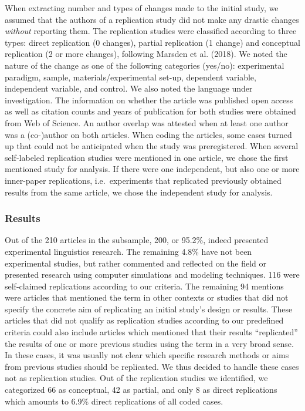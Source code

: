 \documentclass[]{elsarticle} %
\begin{document}
When extracting number and types of changes made to the initial study,
we assumed that the authors of a replication study did not make any
drastic changes \emph{without} reporting them. The replication studies
were classified according to three types: direct replication (0
changes), partial replication (1 change) and conceptual replication (2
or more changes), following Marsden et al. (2018). We noted the nature
of the change as one of the following categories (yes/no): experimental
paradigm, sample, materials/experimental set-up, dependent variable,
independent variable, and control. We also noted the language under
investigation. The information on whether the article was published open
access as well as citation counts and years of publication for both
studies were obtained from Web of Science. An author overlap was
attested when at least one author was a (co-)author on both articles.
When coding the articles, some cases turned up that could not be
anticipated when the study was preregistered. When several self-labeled
replication studies were mentioned in one article, we chose the first
mentioned study for analysis. If there were one independent, but also
one or more inner-paper replications, i.e.~experiments that replicated
previously obtained results from the same article, we chose the
independent study for analysis.

\hypertarget{results-1}{%
\subsubsection{Results}\label{results-1}}

Out of the 210 articles in the subsample, 200, or 95.2\%, indeed
presented experimental linguistics research. The remaining 4.8\% have
not been experimental studies, but rather commented and reflected on the
field or presented research using computer simulations and modeling
techniques. 116 were self-claimed replications according to our
criteria. The remaining 94 mentions were articles that mentioned the
term in other contexts or studies that did not specify the concrete aim
of replicating an initial study's design or results. These articles that
did not qualify as replication studies according to our predefined
criteria could also include articles which mentioned that their results
``replicated'' the results of one or more previous studies using the
term in a very broad sense. In these cases, it was usually not clear
which specific research methods or aims from previous studies should be
replicated. We thus decided to handle these cases not as replication
studies. Out of the replication studies we identified, we categorized 66
as conceptual, 42 as partial, and only 8 as direct replications which
amounts to 6.9\% direct replications of all coded cases.
\end{document}
